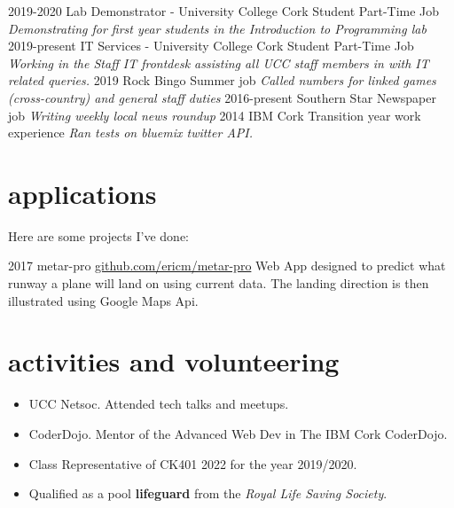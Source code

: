 \documentclass[]{friggeri-cv}
\begin{document}
\begin{entrylist}
  \entry
    {2019-2020}
    {Lab Demonstrator - {\normalfont University College Cork}}
    {Student Part-Time Job}
    {\emph{Demonstrating for first year students in the \textit{Introduction to Programming} lab}}
  \entry
    {2019-present}
    {IT Services - {\normalfont University College Cork}}
    {Student Part-Time Job}
    {\emph{Working in the Staff IT frontdesk assisting all UCC staff members in with IT related queries.}}
  \entry
    {2019}
    {Rock Bingo}
    {Summer job}
    {\emph{Called numbers for linked games (cross-country) and general staff duties}}
  \entry
    {2016-present}
    {Southern Star}
    {Newspaper job}
    {\emph{Writing weekly local news roundup}}
  \entry
    {2014}
    {IBM Cork}
    {Transition year work experience}
    {\emph{Ran tests on bluemix twitter API.}}
\end{entrylist}

\section{applications}

Here are some projects I've done:

\begin{entrylist}
  \entry
    {2017}
    {metar-pro}
    {\href{https://github.com/ericm/metar-pro}{github.com/ericm/metar-pro}}
    {Web App designed to predict what runway a plane will land on using current data. The landing direction is then illustrated using Google Maps Api.}

\end{entrylist}

\section{activities and volunteering}
\begin{itemize}
    \item UCC Netsoc. Attended tech talks and meetups.
    \item CoderDojo. Mentor of the Advanced Web Dev in The IBM Cork CoderDojo.
    \item Class Representative of CK401 2022 for the year 2019/2020.
    \item Qualified as a pool \textbf{lifeguard} from the \textit{Royal Life Saving Society}.
\end{itemize}

% 
\end{document}
